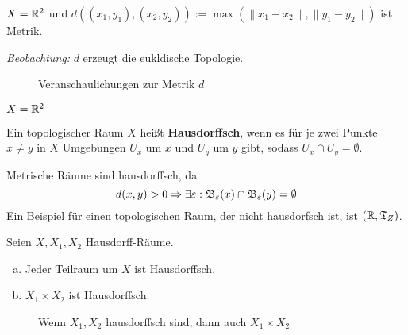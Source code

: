 \begin{beispiel}
    $X = \mathbb{R}^2$ und $d\left ((x_1, y_1), (x_2, y_2)\right ) := \max(\|x_1 - x_2\|, \|y_1 - y_2\|)$
    ist Metrik.

    \emph{Beobachtung:} $d$ erzeugt die eukldische Topologie.

    \begin{figure}[ht]
        \centering
        \subfigure[$\fB_r(0)$]{
            
            \label{fig:open-square}
        }%
        \label{Formen}
        \caption{Veranschaulichungen zur Metrik $d$}
    \end{figure}

\end{beispiel}

\begin{beispiel} 
    $X = \mathbb{R}^2$ 

    
\end{beispiel}

\begin{definition} 
    Ein topologischer Raum $X$ heißt \textbf{Hausdorffsch}, wenn es
    für je zwei Punkte $x \neq y$ in $X$ Umgebungen $U_x$ um $x$
    und $U_y$ um $y$ gibt, sodass $U_x \cap U_y = \emptyset$.
\end{definition}

\begin{bemerkung}
    Metrische Räume sind hausdorffsch, da 
    \[d(x,y) > 0 \Rightarrow \exists \varepsilon: \mathfrak{B}_\varepsilon(x) \cap \mathfrak{B}_\varepsilon(y) = \emptyset\]
    Ein Beispiel für einen topologischen Raum, der nicht hausdorfsch ist,
    ist $(\mathbb{R}, \mathfrak{T}_Z)$.
\end{bemerkung}

\begin{bemerkung}
    Seien $X, X_1, X_2$ Hausdorff-Räume.
    \begin{enumerate}[a)]
        \item Jeder Teilraum um $X$ ist Hausdorffsch.
        \item $X_1 \times X_2$ ist Hausdorffsch.
    \end{enumerate}
    \begin{figure}[htp]
        \centering
        
        \caption{Wenn $X_1, X_2$ hausdorffsch sind, dann auch $X_1 \times X_2$}
    \end{figure}
\end{bemerkung}


